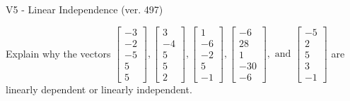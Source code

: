 \begin{exercise}
  \begin{exerciseTitle}V5 - Linear Independence (ver. 497)\end{exerciseTitle}
  \begin{exerciseStatement}
    Explain why the vectors \(\left[\begin{array}{r}
-3 \\
-2 \\
-5 \\
5 \\
5
\end{array}\right] , \left[\begin{array}{r}
3 \\
-4 \\
5 \\
5 \\
2
\end{array}\right] , \left[\begin{array}{r}
1 \\
-6 \\
-2 \\
5 \\
-1
\end{array}\right] , \left[\begin{array}{r}
-6 \\
28 \\
1 \\
-30 \\
-6
\end{array}\right] , \text{ and } \left[\begin{array}{r}
-5 \\
2 \\
5 \\
3 \\
-1
\end{array}\right]\) are linearly dependent or linearly independent.	



\end{exerciseStatement}
\end{exercise}

